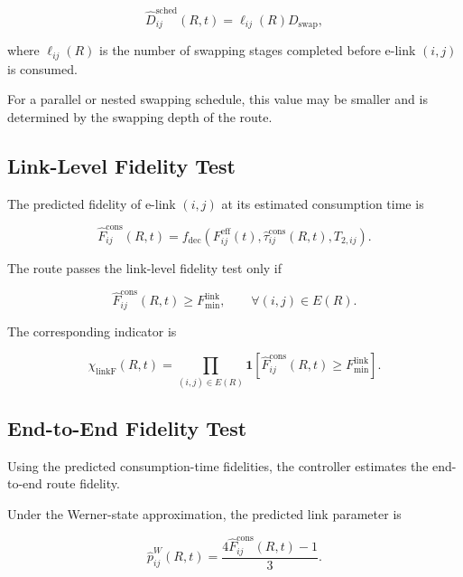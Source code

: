 \begin{equation}
    \widehat{D}_{ij}^{\mathrm{sched}}(R,t)
    =
    \ell_{ij}(R)
    D_{\mathrm{swap}},
\end{equation}

where $\ell_{ij}(R)$ is the number of swapping stages completed before e-link $(i,j)$ is consumed.

For a parallel or nested swapping schedule, this value may be smaller and is determined by the swapping depth of the route.

\subsection{Link-Level Fidelity Test}

The predicted fidelity of e-link $(i,j)$ at its estimated consumption time is

\begin{equation}
    \widehat{F}_{ij}^{\mathrm{cons}}(R,t)
    =
    f_{\mathrm{dec}}
    \left(
    F_{ij}^{\mathrm{eff}}(t),
    \widehat{\tau}_{ij}^{\mathrm{cons}}(R,t),
    T_{2,ij}
    \right).
\end{equation}

The route passes the link-level fidelity test only if

\begin{equation}
    \widehat{F}_{ij}^{\mathrm{cons}}(R,t)
    \geq
    F_{\min}^{\mathrm{link}},
    \qquad
    \forall (i,j)
    \in
    E(R).
\end{equation}

The corresponding indicator is

\begin{equation}
    \chi_{\mathrm{linkF}}(R,t)
    =
    \prod_{
    (i,j)
    \in
    E(R)
    }
    \mathbf{1}
    \left[
    \widehat{F}_{ij}^{\mathrm{cons}}(R,t)
    \geq
    F_{\min}^{\mathrm{link}}
    \right].
\end{equation}

\subsection{End-to-End Fidelity Test}

Using the predicted consumption-time fidelities, the controller estimates the end-to-end route fidelity.

Under the Werner-state approximation, the predicted link parameter is

\begin{equation}
    \widehat{p}_{ij}^{W}(R,t)
    =
    \frac{
    4\widehat{F}_{ij}^{\mathrm{cons}}(R,t)-1
    }{3}.
\end{equation}

